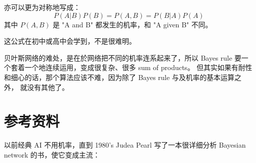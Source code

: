 \documentclass[orivec]{llncs}
\begin{document}
亦可以更为对称地写成：
\begin{equation}
P(A|B)P(B) = P(A,B) = P(B|A)P(A)
\end{equation}
其中 $P(A,B)$ 是 "A and B" 都发生的机率，和 "A given B" 不同。

这公式在初中或高中会学到，不是很难明。

贝叶斯网络的难处，是在於网络把不同的机率连系起来了，所以 Bayes rule 要一个套着一个地连续运用，变成很复杂、很多 sum of products。  但其实如果有耐性和细心的话，那个算法应该不难，因为除了 Bayes rule 与及机率的基本运算之外， 就没有其他了。 

\section{参考资料}

以前经典 AI 不用机率，直到 1980's Judea Pearl 写了一本很详细分析 Bayesian network 的书，使它变成主流：
\end{document}
